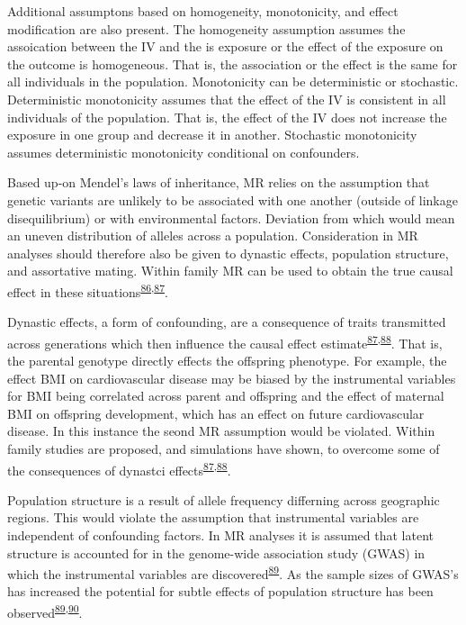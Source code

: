\documentclass[11pt,twoside]{bristolthesis}
\begin{document}
Additional assumptons based on homogeneity, monotonicity, and effect modification are also present. The homogeneity assumption assumes the assoication between the IV and the is exposure or the effect of the exposure on the outcome is homogeneous. That is, the association or the effect is the same for all individuals in the population. Monotonicity can be deterministic or stochastic. Deterministic monotonicity assumes that the effect of the IV is consistent in all individuals of the population. That is, the effect of the IV does not increase the exposure in one group and decrease it in another. Stochastic monotonicity assumes deterministic monotonicity conditional on confounders.

Based up-on Mendel's laws of inheritance, MR relies on the assumption that genetic variants are unlikely to be associated with one another (outside of linkage disequilibrium) or with environmental factors. Deviation from which would mean an uneven distribution of alleles across a population. Consideration in MR analyses should therefore also be given to dynastic effects, population structure, and assortative mating. Within family MR can be used to obtain the true causal effect in these situations\textsuperscript{\protect\hyperlink{ref-Hartwig2018}{86},\protect\hyperlink{ref-Brumpton2019}{87}}.

Dynastic effects, a form of confounding, are a consequence of traits transmitted across generations which then influence the causal effect estimate\textsuperscript{\protect\hyperlink{ref-Brumpton2019}{87},\protect\hyperlink{ref-Sanderson2019}{88}}. That is, the parental genotype directly effects the offspring phenotype. For example, the effect BMI on cardiovascular disease may be biased by the instrumental variables for BMI being correlated across parent and offspring and the effect of maternal BMI on offspring development, which has an effect on future cardiovascular disease. In this instance the seond MR assumption would be violated. Within family studies are proposed, and simulations have shown, to overcome some of the consequences of dynastci effects\textsuperscript{\protect\hyperlink{ref-Brumpton2019}{87},\protect\hyperlink{ref-Sanderson2019}{88}}.

Population structure is a result of allele frequency differning across geographic regions. This would violate the assumption that instrumental variables are independent of confounding factors. In MR analyses it is assumed that latent structure is accounted for in the genome-wide association study (GWAS) in which the instrumental variables are discovered\textsuperscript{\protect\hyperlink{ref-Haworth2019}{89}}. As the sample sizes of GWAS's has increased the potential for subtle effects of population structure has been observed\textsuperscript{\protect\hyperlink{ref-Haworth2019}{89},\protect\hyperlink{ref-Berg2019}{90}}.
\end{document}
